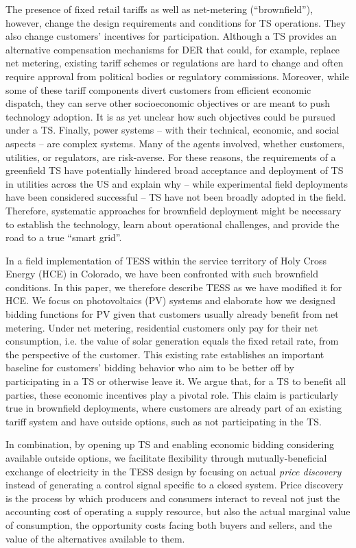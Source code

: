 The presence of fixed retail tariffs as well as net-metering (``brownfield''), however, change the design requirements and conditions for TS operations. They also change customers' incentives for participation. 
Although a TS provides an alternative compensation mechanisms for DER that could, for example, replace net metering, existing tariff schemes or regulations are hard to change and often require approval from political bodies or regulatory commissions. 
Moreover, while some of these tariff components divert customers from efficient economic dispatch, they can serve other socioeconomic objectives or are meant to push technology adoption. It is as yet unclear how such objectives could be pursued under a TS.
Finally, power systems -- with their technical, economic, and social aspects -- are complex systems. Many of the agents involved, whether customers, utilities, or regulators, are risk-averse. 
For these reasons, the requirements of a greenfield TS have potentially hindered broad acceptance and deployment of TS in utilities across the US and explain why -- while experimental field deployments have been considered successful -- TS have not been broadly adopted in the field.
Therefore, systematic approaches for brownfield deployment might be necessary to establish the technology, learn about operational challenges, and provide the road to a true ``smart grid''.

In a field implementation of TESS within the service territory of Holy Cross Energy (HCE) in Colorado, we have been confronted with such brownfield conditions.
In this paper, we therefore describe TESS as we have modified it for HCE. We focus on photovoltaics (PV) systems and elaborate how we designed bidding functions for PV given that customers usually already benefit from net metering. Under net metering, residential customers only pay for their net consumption, i.e. the value of solar generation equals the fixed retail rate, from the perspective of the customer.
This existing rate establishes an important baseline for customers' bidding behavior who aim to be better off by participating in a TS or otherwise leave it.
We argue that, for a TS to benefit all parties, these economic incentives play a pivotal role. This claim is particularly true in brownfield deployments, where customers are already part of an existing tariff system and have outside options, such as not participating in the TS.

In combination, by opening up TS and enabling economic bidding considering available outside options, we facilitate flexibility through mutually-beneficial exchange of electricity in the TESS design by focusing on actual \emph{price discovery} instead of generating a control signal specific to a closed system. Price discovery is the process by which producers and consumers interact to reveal not just the accounting cost of operating a supply resource, but also the actual marginal value of consumption, the opportunity costs facing both buyers and sellers, and the value of the alternatives available to them.  

